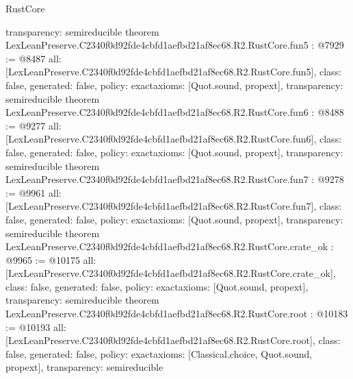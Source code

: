 \begin{lexlean}{RustCore}
\begin{coremodule}
{  transparency: semireducible
}
theorem LexLeanPreserve.C2340f0d92fde4cbfd1aefbd21af8ec68.R2.RustCore.fun5 : @7929 := @8487 {
  all: [LexLeanPreserve.C2340f0d92fde4cbfd1aefbd21af8ec68.R2.RustCore.fun5],
  class: false,
  generated: false,
  policy: exact{axioms: [Quot.sound, propext]},
  transparency: semireducible
}
theorem LexLeanPreserve.C2340f0d92fde4cbfd1aefbd21af8ec68.R2.RustCore.fun6 : @8488 := @9277 {
  all: [LexLeanPreserve.C2340f0d92fde4cbfd1aefbd21af8ec68.R2.RustCore.fun6],
  class: false,
  generated: false,
  policy: exact{axioms: [Quot.sound, propext]},
  transparency: semireducible
}
theorem LexLeanPreserve.C2340f0d92fde4cbfd1aefbd21af8ec68.R2.RustCore.fun7 : @9278 := @9961 {
  all: [LexLeanPreserve.C2340f0d92fde4cbfd1aefbd21af8ec68.R2.RustCore.fun7],
  class: false,
  generated: false,
  policy: exact{axioms: [Quot.sound, propext]},
  transparency: semireducible
}
theorem LexLeanPreserve.C2340f0d92fde4cbfd1aefbd21af8ec68.R2.RustCore.crate_ok : @9965 := @10175 {
  all: [LexLeanPreserve.C2340f0d92fde4cbfd1aefbd21af8ec68.R2.RustCore.crate_ok],
  class: false,
  generated: false,
  policy: exact{axioms: [Quot.sound, propext]},
  transparency: semireducible
}
theorem LexLeanPreserve.C2340f0d92fde4cbfd1aefbd21af8ec68.R2.RustCore.root : @10183 := @10193 {
  all: [LexLeanPreserve.C2340f0d92fde4cbfd1aefbd21af8ec68.R2.RustCore.root],
  class: false,
  generated: false,
  policy: exact{axioms: [Classical.choice, Quot.sound, propext]},
  transparency: semireducible
}


\end{coremodule}
\end{lexlean}
